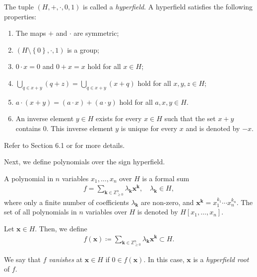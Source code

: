 \begin{remark}
    The tuple \( (H, + , \cdot, 0, 1) \) is called a \emph{hyperfield}. A hyperfield satisfies the following properties:
    \begin{enumerate}
        \item  The maps \( + \) and \( \cdot \) are symmetric;
        \item \( (H \setminus \left\{ 0 \right\}, \cdot, 1) \) is a group;
        \item \( 0 \cdot x = 0 \) and \( 0 + x = x \) hold for all \( x \in H \);
        \item \( \bigcup_{q \in x+y}(q + z) = \bigcup_{q \in x + y}(x + q) \) hold for all \( x,y,z \in H \);
        \item \( a \cdot (x + y) = (a \cdot x) + (a \cdot y) \) hold for all \( a,x,y \in H \).
        \item An inverse element \( y  \in H\) exists for every \( x \in H\) such that the set \( x + y \) contains \( 0 \). This inverse element \( y \) is unique for every \( x \) and is denoted by \( -x \).
    \end{enumerate}

    Refer to \cite{bik2022classifying} Section 6.1 or \cite{baker2018matroids} for more details.
\end{remark}

Next, we define polynomials over the sign hyperfield.

\begin{definition}
    A polynomial in \( n \) variables \( x_1, \dots, x_n \) over \( H \) is a formal sum
    \begin{align*}
        f= \sum_{\mathbf{k} \in \mathbb{Z}^n_{\geq 0}} \lambda_{\mathbf{k}} \mathbf{x}^{\mathbf{k}}, \quad \lambda_{\mathbf{k}} \in H,
    \end{align*}
    where only a finite number of coefficients \( \lambda_{\mathbf{k}} \) are non-zero, and \( \mathbf{x}^{\mathbf{k}} = x_1^{k_1} \cdots x_n^{k_n} \). The set of all polynomials in \( n \) variables over \( H \) is denoted by \( H[x_1, \dots, x_n] \).

    Let \( \mathbf{x} \in H \). Then, we define 
    \begin{align*}
        f(\mathbf{x}) \coloneqq \sum_{\mathbf{k} \in \mathbb{Z}^n_{\geq 0}} \lambda_{\mathbf{k}} \mathbf{x}^{\mathbf{k}} \subset H.
    \end{align*}

    We say that \( f \) \emph{vanishes} at \( \mathbf{x} \in H \) if \( 0 \in f(\mathbf{x}) \). In this case, \( \mathbf{x} \) is a \emph{hyperfield root} of \( f \).
\end{definition}

